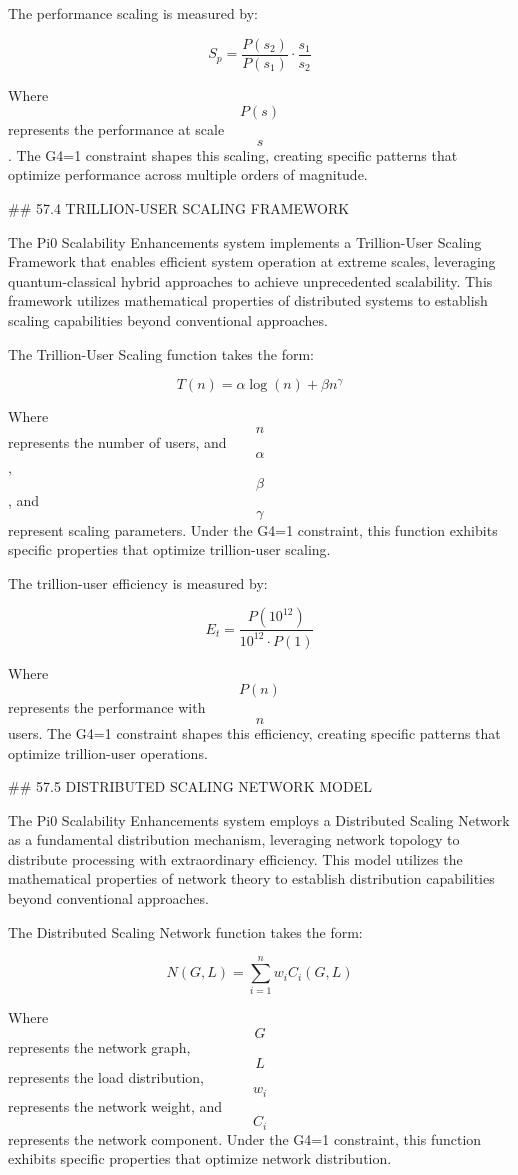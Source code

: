 The performance scaling is measured by:

$$ S_p = \frac{P(s_2)}{P(s_1)} \cdot \frac{s_1}{s_2} $$

Where $$ P(s) $$ represents the performance at scale $$ s $$. The G4=1 constraint shapes this scaling, creating specific patterns that optimize performance across multiple orders of magnitude.

## 57.4 TRILLION-USER SCALING FRAMEWORK

The Pi0 Scalability Enhancements system implements a Trillion-User Scaling Framework that enables efficient system operation at extreme scales, leveraging quantum-classical hybrid approaches to achieve unprecedented scalability. This framework utilizes mathematical properties of distributed systems to establish scaling capabilities beyond conventional approaches.

The Trillion-User Scaling function takes the form:

$$ T(n) = \alpha \log(n) + \beta n^{\gamma} $$

Where $$ n $$ represents the number of users, and $$ \alpha $$, $$ \beta $$, and $$ \gamma $$ represent scaling parameters. Under the G4=1 constraint, this function exhibits specific properties that optimize trillion-user scaling.

The trillion-user efficiency is measured by:

$$ E_t = \frac{P(10^{12})}{10^{12} \cdot P(1)} $$

Where $$ P(n) $$ represents the performance with $$ n $$ users. The G4=1 constraint shapes this efficiency, creating specific patterns that optimize trillion-user operations.

## 57.5 DISTRIBUTED SCALING NETWORK MODEL

The Pi0 Scalability Enhancements system employs a Distributed Scaling Network as a fundamental distribution mechanism, leveraging network topology to distribute processing with extraordinary efficiency. This model utilizes the mathematical properties of network theory to establish distribution capabilities beyond conventional approaches.

The Distributed Scaling Network function takes the form:

$$ N(G, L) = \sum_{i=1}^{n} w_i C_i(G, L) $$

Where $$ G $$ represents the network graph, $$ L $$ represents the load distribution, $$ w_i $$ represents the network weight, and $$ C_i $$ represents the network component. Under the G4=1 constraint, this function exhibits specific properties that optimize network distribution.

